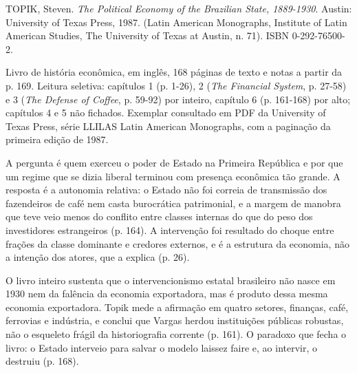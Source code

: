 
\begin{identificacao}
TOPIK, Steven. \emph{The Political Economy of the Brazilian State, 1889-1930}.
Austin: University of Texas Press, 1987. (Latin American Monographs, Institute
of Latin American Studies, The University of Texas at Austin, n. 71). ISBN
0-292-76500-2.

Livro de história econômica, em inglês, 168 páginas de texto e notas a partir da
p. 169. Leitura seletiva: capítulos 1 (p. 1-26), 2 (\emph{The Financial System},
p. 27-58) e 3 (\emph{The Defense of Coffee}, p. 59-92) por inteiro, capítulo 6
(p. 161-168) por alto; capítulos 4 e 5 não fichados. Exemplar consultado em PDF
da University of Texas Press, série LLILAS Latin American Monographs, com a
paginação da primeira edição de 1987.
\end{identificacao}

A pergunta é quem exerceu o poder de Estado na Primeira República e por que um
regime que se dizia liberal terminou com presença econômica tão grande. A
resposta é a autonomia relativa: o Estado não foi correia de transmissão dos
fazendeiros de café nem casta burocrática patrimonial, e a margem de manobra que
teve veio menos do conflito entre classes internas do que do peso dos
investidores estrangeiros (p. 164). A intervenção foi resultado do choque entre
frações da classe dominante e credores externos, e é a estrutura da economia, não
a intenção dos atores, que a explica (p. 26).

O livro inteiro sustenta que o intervencionismo estatal brasileiro não nasce em
1930 nem da falência da economia exportadora, mas é produto dessa mesma economia
exportadora. Topik mede a afirmação em quatro setores, finanças, café, ferrovias
e indústria, e conclui que Vargas herdou instituições públicas robustas, não o
esqueleto frágil da historiografia corrente (p. 161). O paradoxo que fecha o
livro: o Estado interveio para salvar o modelo laissez faire e, ao intervir, o
destruiu (p. 168).

